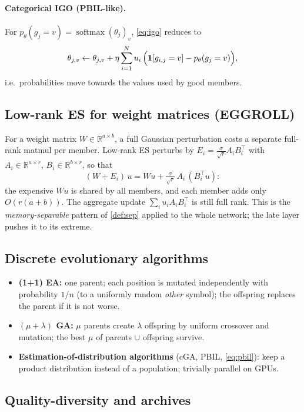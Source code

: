 \documentclass[11pt,a4paper]{article}
\theoremstyle{definition}
\theoremstyle{plain}
\theoremstyle{remark}
\newcommand{\R}{\mathbb{R}}
\newcommand{\ind}[1]{\one\!\left[#1\right]}
\newcommand{\softmax}{\operatorname{softmax}}
\begin{document}
\paragraph{Categorical IGO (PBIL-like).} For $p_\theta(g_j = v) = \softmax(\theta_j)_v$, \cref{eq:igo} reduces to
\begin{equation}
\label{eq:pbil}
\theta_{j,v} \leftarrow \theta_{j,v} + \eta\sum_{i=1}^N u_i\,\Big(\ind{g_{i,j}=v} - p_\theta(g_j=v)\Big),
\end{equation}
i.e.\ probabilities move towards the values used by good members.

\subsection{Low-rank ES for weight matrices (EGGROLL)}

For a weight matrix $W\in\R^{a\times b}$, a full Gaussian perturbation costs a separate full-rank matmul per member. Low-rank ES perturbs by $E_i = \tfrac{\sigma}{\sqrt r} A_i B_i^\top$ with $A_i\in\R^{a\times r}$, $B_i\in\R^{b\times r}$, so that
\[
(W + E_i)\,u = Wu + \tfrac{\sigma}{\sqrt r}\,A_i\,(B_i^\top u):
\]
the expensive $Wu$ is shared by all members, and each member adds only $O(r(a+b))$. The aggregate update $\sum_i u_i A_iB_i^\top$ is still full rank. This is the \emph{memory-separable} pattern of \cref{def:sep} applied to the whole network; the late layer pushes it to its extreme.

\subsection{Discrete evolutionary algorithms}

\begin{itemize}
\item \textbf{(1+1) EA:} one parent; each position is mutated independently with probability $1/n$ (to a uniformly random \emph{other} symbol); the offspring replaces the parent if it is not worse.
\item \textbf{$(\mu+\lambda)$ GA:} $\mu$ parents create $\lambda$ offspring by uniform crossover and mutation; the best $\mu$ of parents $\cup$ offspring survive.
\item \textbf{Estimation-of-distribution algorithms} (cGA, PBIL, \cref{eq:pbil}): keep a product distribution instead of a population; trivially parallel on GPUs.
\end{itemize}

\subsection{Quality-diversity and archives}
\end{document}

